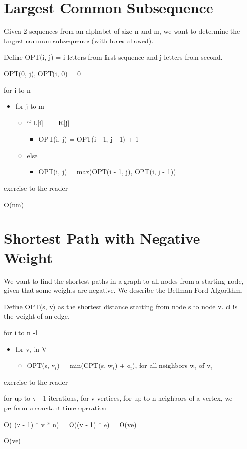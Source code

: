 \section{Largest Common Subsequence}
Given 2 sequences from an alphabet of size n and m, we want to determine the 
largest common subsequence (with holes allowed).
 
Define OPT(i, j) = i letters from first sequence and j letters from second.


\algorithm
{
    \item OPT(0, j), OPT(i, 0) = 0
    \item for i to n
    \begin{itemize}
        \item for j to m
        \begin{itemize}
            \item if L[i] == R[j]
            \begin{itemize}
                \item OPT(i, j) = OPT(i - 1, j - 1) + 1
            \end{itemize}
            \item else
            \begin{itemize}
                \item OPT(i, j) = max(OPT(i - 1, j), OPT(i, j - 1))
            \end{itemize}
        \end{itemize}
    \end{itemize}
}
{
    \item exercise to the reader
}
{
    \item O(nm)
}

\section{Shortest Path with Negative Weight}
We want to find the shortest paths in a graph to all nodes from a starting node, given that some weights are negative. We describe the Bellman-Ford Algorithm.
 
Define OPT(s, v) as the shortest distance starting from node s to node v. ci is the weight of an edge.

\algorithm
{
    \item for i to n -1
    \begin{itemize}
        \item for v$_{i}$ in V
        \begin{itemize}
            \item OPT(s, v$_{i}$) = min(OPT(s, w$_{i}$) + c$_{i}$), for all neighbors w$_{i}$ of v$_{i}$
        \end{itemize}
    \end{itemize}
}
{
    \item exercise to the reader
}
{
    \item for up to v - 1 iterations, for v vertices,  for up to n neighbors of a vertex, we perform a constant time operation
    \item O( (v - 1) * v * n) = O((v - 1) * e) = O(ve)
    \item O(ve)
}

